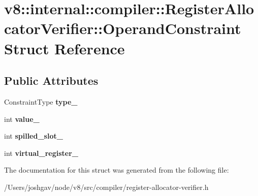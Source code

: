 \hypertarget{structv8_1_1internal_1_1compiler_1_1_register_allocator_verifier_1_1_operand_constraint}{}\section{v8\+:\+:internal\+:\+:compiler\+:\+:Register\+Allocator\+Verifier\+:\+:Operand\+Constraint Struct Reference}
\label{structv8_1_1internal_1_1compiler_1_1_register_allocator_verifier_1_1_operand_constraint}
\subsection*{Public Attributes}
\begin{DoxyCompactItemize}
\item 
Constraint\+Type {\bfseries type\+\_\+}\hypertarget{structv8_1_1internal_1_1compiler_1_1_register_allocator_verifier_1_1_operand_constraint_a194c44e57b8df2fb69700bbca14b1f06}{}\label{structv8_1_1internal_1_1compiler_1_1_register_allocator_verifier_1_1_operand_constraint_a194c44e57b8df2fb69700bbca14b1f06}

\item 
int {\bfseries value\+\_\+}\hypertarget{structv8_1_1internal_1_1compiler_1_1_register_allocator_verifier_1_1_operand_constraint_a541b65bed24fdff812c399b309aaccae}{}\label{structv8_1_1internal_1_1compiler_1_1_register_allocator_verifier_1_1_operand_constraint_a541b65bed24fdff812c399b309aaccae}

\item 
int {\bfseries spilled\+\_\+slot\+\_\+}\hypertarget{structv8_1_1internal_1_1compiler_1_1_register_allocator_verifier_1_1_operand_constraint_a95357e5ae606bd54788e0ce22d640d65}{}\label{structv8_1_1internal_1_1compiler_1_1_register_allocator_verifier_1_1_operand_constraint_a95357e5ae606bd54788e0ce22d640d65}

\item 
int {\bfseries virtual\+\_\+register\+\_\+}\hypertarget{structv8_1_1internal_1_1compiler_1_1_register_allocator_verifier_1_1_operand_constraint_ae64fa710d4c4cad5331c3d3e7a000205}{}\label{structv8_1_1internal_1_1compiler_1_1_register_allocator_verifier_1_1_operand_constraint_ae64fa710d4c4cad5331c3d3e7a000205}

\end{DoxyCompactItemize}


The documentation for this struct was generated from the following file\+:\begin{DoxyCompactItemize}
\item 
/\+Users/joshgav/node/v8/src/compiler/register-\/allocator-\/verifier.\+h\end{DoxyCompactItemize}
